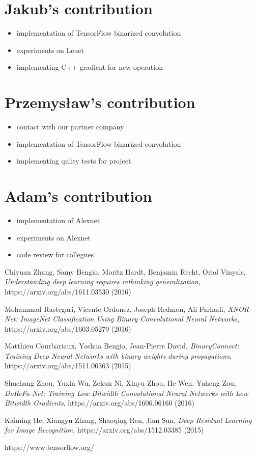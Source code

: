 \documentclass[licencjacka]{pracamgr}
\begin{document}
	\section{Jakub's contribution}
		\begin{itemize}
			\item implementation of TensorFlow binarized convolution
			\item experiments on Lenet
			\item implementing C++ gradient for new operation
		\end{itemize}
	\section{Przemysław's contribution}
		\begin{itemize}
			\item contact with our partner company
			\item implementation of TensorFlow binarized convolution
			\item implementing qulity tests for project
		\end{itemize}
	\section{Adam's contribution}
		\begin{itemize}
			\item implementation of Alexnet
			\item experiments on Alexnet
			\item code review for collegues
		\end{itemize}


\begin{thebibliography}{99}

 Chiyuan Zhang, Samy Bengio, Moritz Hardt, Benjamin Recht, Oriol Vinyals, \textit{Understanding deep learning requires rethinking generalization}, https://arxiv.org/abs/1611.03530 (2016)

 Mohammad Rastegari, Vicente Ordonez, Joseph Redmon, Ali Farhadi, \textit{XNOR-Net: ImageNet Classification Using Binary Convolutional Neural Networks}, https://arxiv.org/abs/1603.05279 (2016)

 Matthieu Courbariaux, Yoshua Bengio, Jean-Pierre David, \textit{BinaryConnect: Training Deep Neural Networks with binary weights during propagations}, https://arxiv.org/abs/1511.00363 (2015)

 Shuchang Zhou, Yuxin Wu, Zekun Ni, Xinyu Zhou, He Wen, Yuheng Zou, \textit{DoReFa-Net: Training Low Bitwidth Convolutional Neural Networks with Low Bitwidth Gradients}, https://arxiv.org/abs/1606.06160 (2016)

 Kaiming He, Xiangyu Zhang, Shaoqing Ren, Jian Sun, \textit{Deep Residual Learning for Image Recognition}, https://arxiv.org/abs/1512.03385 (2015)

 https://www.tensorflow.org/

\end{thebibliography}
\end{document}
